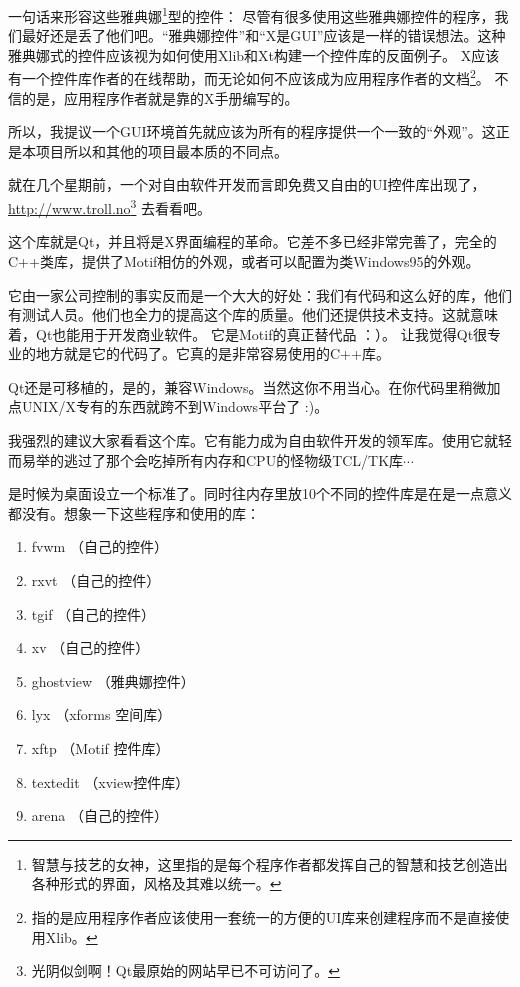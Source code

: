 \begin{insertnote}
一句话来形容这些雅典娜\footnote{智慧与技艺的女神，这里指的是每个程序作者都发挥自己的智慧和技艺创造出各种形式的界面，风格及其难以统一。}型的控件：
尽管有很多使用这些雅典娜控件的程序，我们最好还是丢了他们吧。“雅典娜控件”和“X是GUI”应该是一样的错误想法。这种雅典娜式的控件应该视为如何使用Xlib和Xt构建一个控件库的反面例子。
X应该有一个控件库作者的在线帮助，而无论如何不应该成为应用程序作者的文档\footnote{指的是应用程序作者应该使用一套统一的方便的UI库来创建程序而不是直接使用Xlib。}。 不信的是，应用程序作者就是靠的X手册编写的。

所以，我提议一个GUI环境首先就应该为所有的程序提供一个一致的“外观”。这正是本项目所以和其他的项目最本质的不同点。

就在几个星期前，一个对自由软件开发而言即免费又自由的UI控件库出现了，\url{http://www.troll.no}\footnote{光阴似剑啊！Qt最原始的网站早已不可访问了。} 去看看吧。

这个库就是Qt，并且将是X界面编程的革命。它差不多已经非常完善了，完全的C++类库，提供了Motif相仿的外观，或者可以配置为类Windows95的外观。

它由一家公司控制的事实反而是一个大大的好处：我们有代码和这么好的库，他们有测试人员。他们也全力的提高这个库的质量。他们还提供技术支持。这就意味着，Qt也能用于开发商业软件。
它是Motif的真正替代品 ：）。  让我觉得Qt很专业的地方就是它的代码了。它真的是非常容易使用的C++库。

Qt还是可移植的，是的，兼容Windows。当然这你不用当心。在你代码里稍微加点UNIX/X专有的东西就跨不到Windows平台了 :)。


我强烈的建议大家看看这个库。它有能力成为自由软件开发的领军库。使用它就轻而易举的逃过了那个会吃掉所有内存和CPU的怪物级TCL/TK库$\cdots$

是时候为桌面设立一个标准了。同时往内存里放10个不同的控件库是在是一点意义都没有。想象一下这些程序和使用的库：

\begin{enumerate}
\item[\textbullet]    fvwm （自己的控件）
\item[\textbullet]    rxvt （自己的控件）
\item[\textbullet]    tgif （自己的控件）
\item[\textbullet]    xv （自己的控件）
\item[\textbullet]    ghostview （雅典娜控件）
\item[\textbullet]    lyx （xforms 空间库）
\item[\textbullet]    xftp （Motif 控件库）
\item[\textbullet]    textedit （xview控件库）
\item[\textbullet]    arena （自己的控件）
\end{enumerate}


\end{insertnote}

